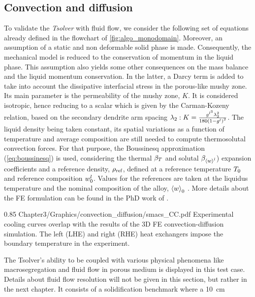 \subsection{Convection and diffusion}
To validate the \emph{Tsolver} with fluid flow, we consider the following set of equations
already defined in the flowchart of \cref{fig:algo_monodomain}. Moreover, an assumption 
of a static and non deformable solid phase is made. Consequently, the mechanical model is 
reduced to the conservation of momentum in the liquid phase. This assumption also yields 
some other consequences on the mass balance and the liquid momentum conservation. In the 
latter, a Darcy term is added to take into account the dissipative interfacial stress in 
the porous-like mushy zone. Its main parameter is the permeability of the mushy zone, $K$. 
It is considered isotropic, hence reducing to a scalar which is given by the Carman-Kozeny 
relation, based on the secondary dendrite arm spacing $\lambda_2: K= \frac{g^{l^3}  \lambda_2^{2}
 }{180\left( 1-g^l \right)^2}$. The liquid density being taken constant, its spatial variations 
as a function of temperature and average composition are still needed to compute thermosolutal 
convection forces. For that purpose, the Boussinesq approximation (\cref{eq:boussinesq}) is used, 
considering the thermal $\beta_T$ and solutal $\beta_{\left \langle w \right \rangle^l}$) expansion coefficients 
and a reference density, $\rho_{\text{ref}}$, defined at a reference temperature $T_{0}$ and reference 
composition $w_{0}^l$. Values for the references are taken at the liquidus temperature and the nominal 
composition of the alloy, $\left \langle w \right \rangle_0$ \citep{carozzani_direct_2013}. More details about the FE formulation can be found in 
the PhD work of \citet{rivaux_simulation_2011, carozzani_developpement_2012}.
%
\begin{figureth}
{0.85}
{Chapter3/Graphics/convection_diffusion/smacs_CC.pdf}
{Experimental cooling curves overlap with the results of the 3D FE convection-diffusion simulation.
The left (LHE) and right (RHE) heat exchangers impose the boundary temperature in the experiment.}
\label{fig:validation_convectiondiffusion}
\end{figureth}
%
The Tsolver’s ability to be coupled with various physical phenomena like macrosegregation and fluid flow 
in porous medium is displayed in this test case. Details about fluid flow resolution will not be given 
in this section, but rather in the next chapter. It consists of a solidification benchmark where a \SI{10}{\centi \metre}
